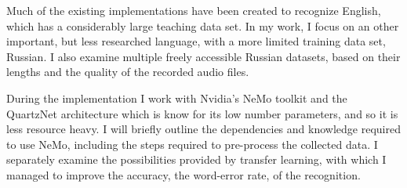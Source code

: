 Much of the existing implementations have been created to recognize English, which has a considerably large teaching data set. In my work, I focus on an other important, but less researched language, with a more limited training data set, Russian. I also examine multiple freely accessible Russian datasets, based on their lengths and the quality of the recorded audio files.

During the implementation I work with Nvidia's NeMo toolkit and the QuartzNet architecture which is know for its low number parameters, and so it is less resource heavy. I will briefly outline the dependencies and knowledge required to use NeMo, including the steps required to pre-process the collected data. I separately examine the possibilities provided by transfer learning, with which I managed to improve the accuracy, the word-error rate, of the recognition.


\vfill
\selectthesislanguage

\setcounter{romanPage}{\value{page}}
